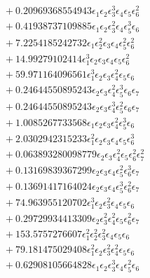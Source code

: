 \documentclass[10pt]{article}
\begin{document}
\begin{align*}
&{}  + 0.20969368554943 \epsilon_{1} \epsilon_{2} \epsilon_{3}^{3} \epsilon_{4} \epsilon_{5} \epsilon_{6}^{2} \\
&{}  + 0.41938737109885 \epsilon_{1} \epsilon_{2} \epsilon_{3}^{2} \epsilon_{4} \epsilon_{5}^{3} \epsilon_{6} \\
&{}  + 7.2254185242732 \epsilon_{1} \epsilon_{2}^{2} \epsilon_{3} \epsilon_{4} \epsilon_{5}^{2} \epsilon_{6}^{2} \\
&{}  + 14.99279102414 \epsilon_{1}^{3} \epsilon_{2} \epsilon_{3} \epsilon_{4} \epsilon_{5} \epsilon_{6}^{2} \\
&{}  + 59.971164096561 \epsilon_{1}^{3} \epsilon_{2} \epsilon_{3} \epsilon_{4}^{2} \epsilon_{5} \epsilon_{6} \\
&{}  + 0.24644550895243 \epsilon_{2} \epsilon_{3} \epsilon_{4}^{2} \epsilon_{5}^{3} \epsilon_{6} \epsilon_{7} \\
&{}  + 0.24644550895243 \epsilon_{2} \epsilon_{3} \epsilon_{4}^{3} \epsilon_{5}^{2} \epsilon_{6} \epsilon_{7} \\
&{}  + 1.0085267733568 \epsilon_{1} \epsilon_{2} \epsilon_{3} \epsilon_{4}^{2} \epsilon_{5}^{3} \epsilon_{6} \\
&{}  + 2.0302942315233 \epsilon_{1}^{2} \epsilon_{2} \epsilon_{3} \epsilon_{4} \epsilon_{5} \epsilon_{6}^{3} \\
&{}  + 0.063893280098779 \epsilon_{2} \epsilon_{3} \epsilon_{4}^{2} \epsilon_{5} \epsilon_{6}^{2} \epsilon_{7}^{2} \\
&{}  + 0.13169839367299 \epsilon_{2} \epsilon_{3} \epsilon_{4} \epsilon_{5}^{2} \epsilon_{6}^{3} \epsilon_{7} \\
&{}  + 0.13691417164024 \epsilon_{2} \epsilon_{3} \epsilon_{4} \epsilon_{5}^{3} \epsilon_{6}^{2} \epsilon_{7} \\
&{}  + 74.963955120702 \epsilon_{1}^{3} \epsilon_{2} \epsilon_{3}^{2} \epsilon_{4} \epsilon_{5} \epsilon_{6} \\
&{}  + 0.29729934413309 \epsilon_{2} \epsilon_{3}^{2} \epsilon_{4}^{2} \epsilon_{5} \epsilon_{6}^{2} \epsilon_{7} \\
&{}  + 153.5757276607 \epsilon_{1}^{2} \epsilon_{2}^{2} \epsilon_{3}^{2} \epsilon_{4} \epsilon_{5} \epsilon_{6} \\
&{}  + 79.181475029408 \epsilon_{1}^{2} \epsilon_{2} \epsilon_{3}^{2} \epsilon_{4}^{2} \epsilon_{5} \epsilon_{6} \\
&{}  + 0.62908105664828 \epsilon_{1} \epsilon_{2} \epsilon_{3}^{3} \epsilon_{4} \epsilon_{5}^{2} \epsilon_{6} \\

\end{align*}
\end{document}

